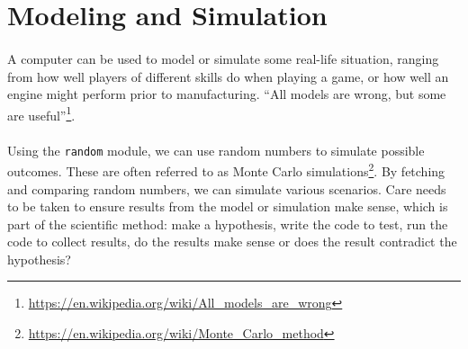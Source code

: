 \documentclass[letter,10pt]{article}
\begin{document}
\section{Modeling and Simulation}
\paragraph{}A computer can be used to model or simulate some real-life situation, ranging from how well players of different skills do when playing a game, or how well an engine might perform prior to manufacturing. ``All models are wrong, but some are useful''\footnote{\url{https://en.wikipedia.org/wiki/All_models_are_wrong}}.

\paragraph{}Using the \verb|random| module, we can use random numbers to simulate possible outcomes. These are often referred to as Monte Carlo simulations\footnote{\url{https://en.wikipedia.org/wiki/Monte_Carlo_method}}. By fetching and comparing random numbers, we can simulate various scenarios. Care needs to be taken to ensure results from the model or simulation make sense, which is part of the scientific method: make a hypothesis, write the code to test, run the code to collect results, do the results make sense or does the result contradict the hypothesis?
\end{document}
